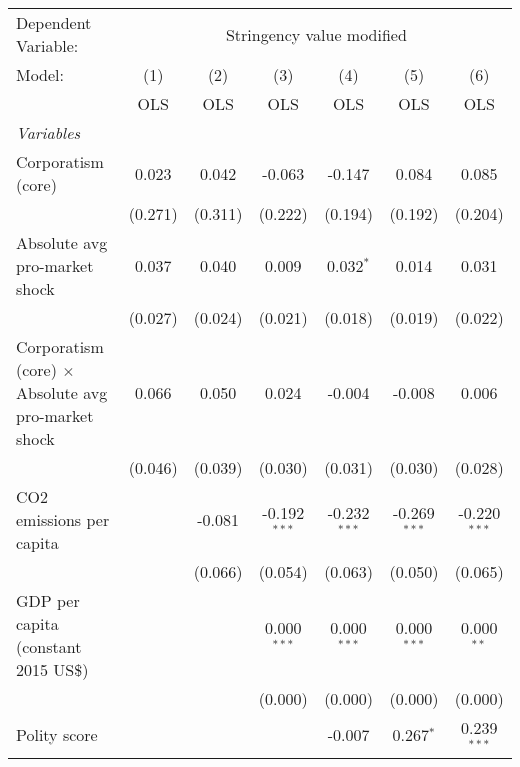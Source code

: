 
\begingroup
\centering
\begin{tabular}{lcccccc}
   \toprule
   Dependent Variable: & \multicolumn{6}{c}{Stringency value modified}\\
   Model:                                                     & (1)     & (2)     & (3)            & (4)            & (5)            & (6)\\  
                                                              &  OLS    & OLS     & OLS            & OLS            & OLS            & OLS\\  
   \midrule
   \emph{Variables}\\
   Corporatism (core)                                         & 0.023   & 0.042   & -0.063         & -0.147         & 0.084          & 0.085\\   
                                                              & (0.271) & (0.311) & (0.222)        & (0.194)        & (0.192)        & (0.204)\\   
   Absolute avg pro-market shock                              & 0.037   & 0.040   & 0.009          & 0.032$^{*}$    & 0.014          & 0.031\\   
                                                              & (0.027) & (0.024) & (0.021)        & (0.018)        & (0.019)        & (0.022)\\   
   Corporatism (core) $\times$ Absolute avg pro-market shock  & 0.066   & 0.050   & 0.024          & -0.004         & -0.008         & 0.006\\   
                                                              & (0.046) & (0.039) & (0.030)        & (0.031)        & (0.030)        & (0.028)\\   
   CO2 emissions per capita                                   &         & -0.081  & -0.192$^{***}$ & -0.232$^{***}$ & -0.269$^{***}$ & -0.220$^{***}$\\   
                                                              &         & (0.066) & (0.054)        & (0.063)        & (0.050)        & (0.065)\\   
   GDP per capita (constant 2015 US\$)                        &         &         & 0.000$^{***}$  & 0.000$^{***}$  & 0.000$^{***}$  & 0.000$^{**}$\\   
                                                              &         &         & (0.000)        & (0.000)        & (0.000)        & (0.000)\\   
   Polity score                                               &         &         &                & -0.007         & 0.267$^{*}$    & 0.239$^{***}$\\   

\end{tabular}
